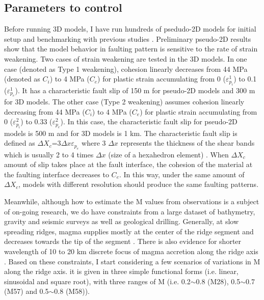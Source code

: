 \subsection{Parameters to control}
Before running 3D models, I have run hundreds of psedudo-2D models for initial setup and benchmarking with previous studies \citep[e.g.,][]{Buck2005, Tucholke2008}. Preliminary pseudo-2D results show that the model behavior in faulting pattern is sensitive to the rate of strain weakening. Two cases of strain weakening are tested in the 3D models. In one case (denoted as Type 1 weakening), cohesion linearly decreases from 44 MPa (denoted as $C_{i}$) to 4 MPa ($C_{e}$) for plastic strain accumulating from 0 ($\varepsilon_{p_{i}}^{1}$) to 0.1 ($\varepsilon_{p_{e}}^{1}$). It has a characteristic fault slip of 150 m for pseudo-2D models and 300 m for 3D models. The other case (Type 2 weakening) assumes cohesion linearly decreasing from 44 MPa ($C_{i}$) to 4 MPa ($C_{e}$) for plastic strain accumulating from 0 ($\varepsilon_{p_{i}}^{2}$) to 0.33 ($\varepsilon_{p_{e}}^{2}$). In this case, the characteristic fault slip for pseudo-2D models is 500 m and for 3D models is 1 km. The characteristic fault slip is defined as $\Delta X_{c}$=3$\Delta x \varepsilon_{p_{e}}$ where 3 $\Delta x$ represents the thickness of the shear bands which is usually 2 to 4 times $\Delta x$ (size of a hexahedron element) \citep{Lavier2000}. When $\Delta X_{c}$ amount of slip takes place at the fault interface, the cohesion of the material at the faulting interface decreases to $C_{e}$. In this way, under the same amount of $\Delta X_{c}$, models with different resolution should produce the same faulting patterns. 

Meanwhile, although how to estimate the M values from observations is a subject of on-going research, we do have constraints from a large dataset of bathymetry, gravity and seismic surveys as well as geological drilling. Generally, at slow spreading ridges, magma supplies mostly at the center of the ridge segment and decreases towards the tip of the segment \citep{Tolstoy1993,Chen1999,Carbotte2015}. There is also evidence for shorter wavelength of 10 to 20 km discrete focus of magma accretion along the ridge axis \citep{Lin1990}. Based on these constraints, I start considering a few scenarios of variations in M along the ridge axis. it is given in three simple functional forms (i.e. linear, sinusoidal and square root), with three ranges of M (i.e. 0.2$\sim$0.8 (M28), 0.5$\sim$0.7 (M57) and 0.5$\sim$0.8 (M58)).

